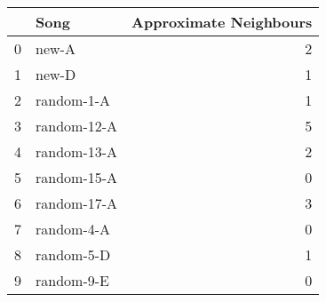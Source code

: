 \begin{tabular}{llr}
\toprule
 & Song & Approximate Neighbours \\
\midrule
0 & new-A & 2 \\
1 & new-D & 1 \\
2 & random-1-A & 1 \\
3 & random-12-A & 5 \\
4 & random-13-A & 2 \\
5 & random-15-A & 0 \\
6 & random-17-A & 3 \\
7 & random-4-A & 0 \\
8 & random-5-D & 1 \\
9 & random-9-E & 0 \\
\bottomrule
\end{tabular}

